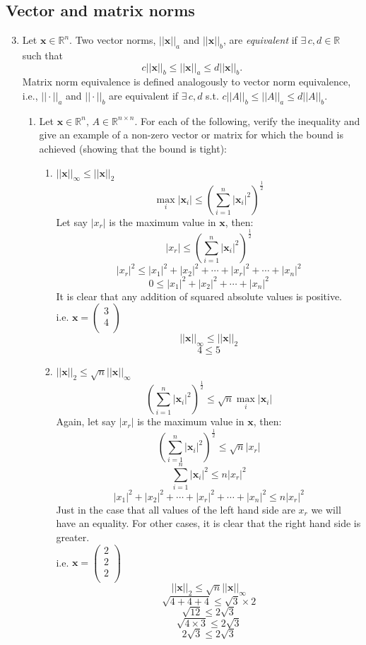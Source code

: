 \documentclass{article}
\renewcommand{\vec}[1]{\mathbf{#1}}
\begin{document}
\subsection*{Vector and matrix norms}
\begin{enumerate}
\setcounter{enumi}{2}
\item Let $\vec{x} \in \mathbb{R}^n$. Two vector norms, $||\vec{x}||_a$ and $||\vec{x}||_b$, are \emph{equivalent} if
  $\exists \, c,d \in \mathbb{R}$ such that
$$c||\vec{x}||_b \leq ||\vec{x}||_a \leq d||\vec{x}||_b.$$
Matrix norm equivalence is defined analogously to vector norm equivalence, i.e., $||\cdot||_a$ and $||\cdot||_b$ are
equivalent if $\exists \, c,d$ s.t. $c||A||_b \leq ||A||_a \leq d||A||_b$.
  \begin{enumerate}
  \item Let $\vec{x} \in \mathbb{R}^n, \, A \in \mathbb{R}^{n \times n}$.  For each of the following, verify the inequality and give an example of a non-zero vector or matrix for which the
  bound is achieved (showing that the bound is tight):
    \begin{enumerate}
      \item $||\vec{x}||_\infty \leq ||\vec{x}||_2$
      $$ \max_i|\vec{x}_i| \leq \left(\sum_{i=1}^n{|\vec{x}_i|^2}\right)^\frac{1}{2}$$
      Let say $|x_r|$ is the maximum value in $\vec{x}$, then:
      $$ |x_r| \leq (\sum_{i=1}^n{|\vec{x}_i|^2})^\frac{1}{2}$$
      $$ |x_r|^2 \leq |x_1|^2+|x_2|^2+\cdots+|x_r|^2+\cdots+|x_n|^2$$
      $$ 0 \leq |x_1|^2+|x_2|^2+\cdots+|x_n|^2$$
      It is clear that any addition of squared absolute values is positive.\\
      i.e. $\vec{x}= \left(\begin{array}{c} 3 \\ 4 \\ \end{array} \right)$
      $$ ||\vec{x}||_\infty \leq ||\vec{x}||_2$$
      $$ 4 \leq 5$$
      \item $||\vec{x}||_2 \leq \sqrt{n} ||\vec{x}||_\infty$
      $$ \left(\sum_{i=1}^n{|\vec{x}_i|^2}\right)^\frac{1}{2} \leq \sqrt{n}\max_i|\vec{x}_i| $$
      Again, let say $|x_r|$ is the maximum value in $\vec{x}$, then:
      $$ \left(\sum_{i=1}^n{|\vec{x}_i|^2}\right)^\frac{1}{2}  \leq \sqrt{n}|x_r| $$
      $$ \sum_{i=1}^n{|\vec{x}_i|^2} \leq n|x_r|^2 $$
      $$ |x_1|^2+|x_2|^2+\cdots+|x_r|^2+\cdots+|x_n|^2 \leq n|x_r|^2 $$
      Just in the case that all values of the left hand side are $x_r$ we will have an equality. For other cases, it is clear that the right hand side is greater.\\
      i.e. $\vec{x}= \left(\begin{array}{c} 2 \\ 2 \\ 2 \\ \end{array} \right)$
      $$ ||\vec{x}||_2 \leq \sqrt{n} ||\vec{x}||_\infty$$
      $$ \sqrt{4+4+4} \leq \sqrt{3}\times2 $$
      $$ \sqrt{12} \leq 2\sqrt{3} $$
      $$ \sqrt{4\times3} \leq 2\sqrt{3} $$
      $$ 2\sqrt{3} \leq 2\sqrt{3} $$


\end{enumerate}
\end{enumerate}
\end{enumerate}
\end{document}
